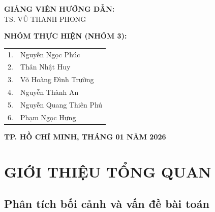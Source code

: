 \documentclass[12pt,a4paper]{article}
\begin{document}
\begin{titlepage}
    \vspace{1.5cm}

    \begin{minipage}{0.8\textwidth} %
        \centering
        \textbf{GIẢNG VIÊN HƯỚNG DẪN:}\\
        TS. VŨ THANH PHONG
        \vspace{0.5cm}
        
        \textbf{NHÓM THỰC HIỆN (NHÓM 3):}\\
        \vspace{0.2cm}
        \begin{tabular}{l l} 
        1. & Nguyễn Ngọc Phúc \\
        2. & Thân Nhật Huy \\
        3. & Võ Hoàng Đình Trường \\ 
        4. & Nguyễn Thành An \\
        5. & Nguyễn Quang Thiên Phú \\
        6. & Phạm Ngọc Hưng \\
        \end{tabular}
    \end{minipage}

    \vfill

    \textbf{TP. HỒ CHÍ MINH, THÁNG 01 NĂM 2026}
    \vspace{1cm}

    \restoregeometry
\end{titlepage}

\tableofcontents
\newpage

\section{GIỚI THIỆU TỔNG QUAN}

\subsection{Phân tích bối cảnh và vấn đề bài toán}
\end{document}
